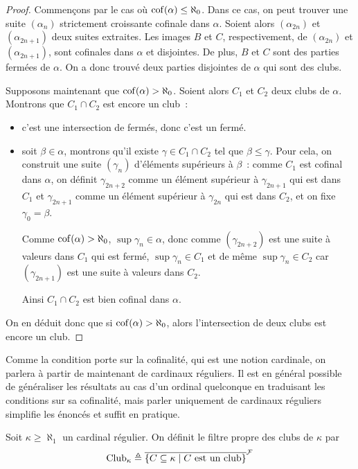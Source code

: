 \begin{proof}
  Commençons par le cas où $\operatorname{cof}(\alpha) \leq \aleph_0$. Dans ce cas, on peut
  trouver une suite $(\alpha_n)$ strictement croissante cofinale dans $\alpha$.
  Soient alors $(\alpha_{2n})$ et $(\alpha_{2n+1})$ deux suites extraites. Les
  images $B$ et $C$, respectivement, de $(\alpha_{2n})$ et $(\alpha_{2n+1})$, sont
  cofinales dans $\alpha$ et disjointes. De plus, $B$ et $C$ sont des parties
  fermées de $\alpha$. On a donc trouvé deux parties disjointes de $\alpha$ qui
  sont des clubs.

  Supposons maintenant que $\operatorname{cof}(\alpha) > \aleph_0$. Soient alors $C_1$ et
  $C_2$ deux clubs de $\alpha$. Montrons que $C_1\cap C_2$ est encore un club~:
  \begin{itemize}
  \item c'est une intersection de fermés, donc c'est un fermé.
  \item soit $\beta \in \alpha$, montrons qu'il existe $\gamma \in C_1\cap C_2$
    tel que $\beta \leq \gamma$. Pour cela, on construit une suite $(\gamma_n)$
    d'éléments supérieurs à $\beta$~: comme $C_1$ est cofinal dans $\alpha$,
    on définit $\gamma_{2n+2}$ comme un élément supérieur à $\gamma_{2n+1}$ qui
    est dans $C_1$ et $\gamma_{2n+1}$ comme un élément supérieur à
    $\gamma_{2n}$ qui est dans $C_2$, et on fixe $\gamma_0 = \beta$.

    Comme $\operatorname{cof}(\alpha) > \aleph_0$, $\sup \gamma_n \in \alpha$, donc comme
    $(\gamma_{2n+2})$ est une suite à valeurs dans $C_1$ qui est fermé,
    $\sup \gamma_n \in C_1$ et de même $\sup \gamma_n \in C_2$ car
    $(\gamma_{2n+1})$ est une suite à valeurs dans $C_2$.

    Ainsi $C_1\cap C_2$ est bien cofinal dans $\alpha$.
  \end{itemize}
  On en déduit donc que si $\operatorname{cof}(\alpha) > \aleph_0$, alors l'intersection de
  deux clubs est encore un club.
\end{proof}

Comme la condition porte sur la cofinalité, qui est une notion cardinale, on
parlera à partir de maintenant de cardinaux réguliers. Il est en général
possible de généraliser les résultats au cas d'un ordinal quelconque en
traduisant les conditions sur sa cofinalité, mais parler uniquement de cardinaux
réguliers simplifie les énoncés et suffit en pratique.

\begin{definition}
  Soit $\kappa \geq \aleph_1$ un cardinal régulier. On définit le filtre propre
  des clubs de $\kappa$ par
  \[\operatorname{Club}_\kappa \triangleq \overline{\{C\subseteq \kappa
    \mid C\text{ est un club}\}}^{\mathcal F}\]
\end{definition}

